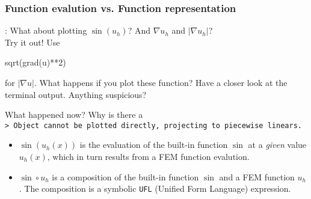 \begin{frame}[fragile]
    \frametitle{Function evalution vs. Function representation}
    : What about plotting $\sin(u_h)$? And $\nabla u_h$
    and $| \nabla u_h |$? \\
     Try it out! Use
    \vspace{-1em}
    \begin{python}
sqrt(grad(u)**2)
    \end{python}
    for $|\nabla u |$.
    What happens if you plot these function? Have a closer
    look at the terminal output. Anything suspicious?

    \vspace{1em}
 What happened now? Why is there a \\
\texttt{> Object cannot be plotted directly, projecting to piecewise
linears.}\\
\begin{itemize}

    \item $\sin(u_h(x))$ is the evaluation of the built-in function $\sin$ at a
        \emph{given} value $u_h(x)$, which in turn results from a
        FEM function evalution. \\
    \item  $\sin \circ u_h$ is a composition of the built-in function $\sin$ and a
        FEM function $u_h$. The composition is a symbolic \texttt{UFL} (Unified
        Form Language) expression.
\end{itemize}
\end{frame}
